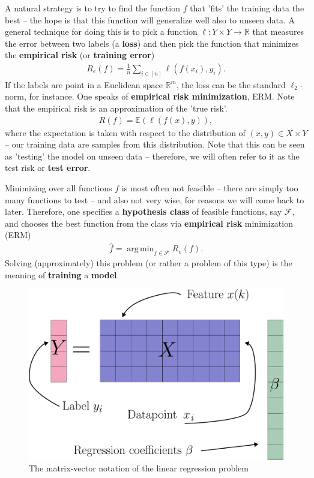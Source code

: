 \documentclass{article}
\DeclareMathOperator*{\argmin}{arg\,min}
\newcommand{\calF}{\mathcal{F}}
\newcommand{\R}{\mathbb{R}}
\begin{document}
A natural strategy is to try to find the function $f$ that 'fits' the training data the best -- the hope is that this function will generalize well also to unseen data. A general technique for doing this is to pick a function $\ell: Y \times Y \to \R$ that measures the error between two labels (a \textbf{loss}) and then pick the function that minimizes the \textbf{empirical risk} (or \textbf{training error})
\begin{align*}
    R_e(f) = \tfrac{1}{n} \sum_{i \in [n]} \ell(f(x_i),y_i).
\end{align*}
If the labels are point in a Euclidean space $\R^m$, the loss can be the standard $\ell_2$-norm, for instance. One speaks of \textbf{empirical risk minimization}, ERM. Note that the empirical risk is an approximation of the 'true risk'. 
\begin{align*}
    R(f) = \mathbb{E}(\ell(f(x),y)),
\end{align*}
where the expectation is taken with respect to the distribution of $(x,y) \in X \times Y$ -- our training data are samples from this distribution. Note that this can be seen as 'testing' the model on unseen data -- therefore, we will often refer to it as the test risk or \textbf{test error}.

Minimizing over all functions $f$ is most often not feasible -- there are simply too many functions to test -- and also not very wise, for reasons we will come back to later. Therefore, one specifies a \textbf{hypothesis class} of feasible functions, say $\calF$, and chooses the best function from the class via \textbf{empirical risk} minimization (ERM) 
\begin{align*}
    \hat{f} = \argmin_{f\in \calF} R_e(f).
\end{align*}
Solving (approximately) this problem (or rather a problem of this type) is the meaning of \textbf{training} a \textbf{model}.

\begin{figure}
    \centering
    \includegraphics[width=0.5\linewidth]{graphics/linear_regression.png}
    \caption{The matrix-vector notation of the linear regression problem}
    \label{fig:linreg}
\end{figure}
\end{document}

